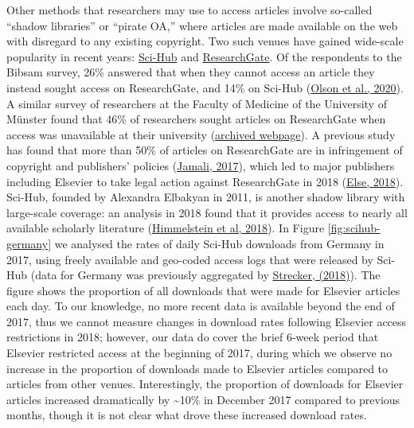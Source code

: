 \documentclass[
]{article}
\begin{document}
Other methods that researchers may use to access articles involve so-called ``shadow libraries'' or ``pirate OA,'' where articles are made available on the web with disregard to any existing copyright. Two such venues have gained wide-scale popularity in recent years: \href{https://sci-hub.se/}{Sci-Hub} and \href{https://www.researchgate.net/}{ResearchGate}. Of the respondents to the Bibsam survey, 26\% answered that when they cannot access an article they instead sought access on ResearchGate, and 14\% on Sci-Hub (\href{http://doi.org/10.1629/uksg.507}{Olson et al., 2020}). A similar survey of researchers at the Faculty of Medicine of the University of Münster found that 46\% of researchers sought articles on ResearchGate when access was unavailable at their university (\href{https://web.archive.org/web/20210429130228/https://www.uni-muenster.de/ZBMed/aktuelles/27987}{archived webpage}). A previous study has found that more than 50\% of articles on ResearchGate are in infringement of copyright and publishers' policies (\href{https://doi.org/10.1007/s11192-017-2291-4}{Jamali, 2017}), which led to major publishers including Elsevier to take legal action against ResearchGate in 2018 (\href{https://doi.org/10.1038/d41586-018-06945-6}{Else, 2018}). Sci-Hub, founded by Alexandra Elbakyan in 2011, is another shadow library with large-scale coverage: an analysis in 2018 found that it provides access to nearly all available scholarly literature (\href{https://doi.org/10.7554/eLife.32822}{Himmelstein et al, 2018}). In Figure \ref{fig:scihub-germany} we analysed the rates of daily Sci-Hub downloads from Germany in 2017, using freely available and geo-coded access logs that were released by Sci-Hub (data for Germany was previously aggregated by \href{http://doi.org/10.5281/zenodo.1286284}{Strecker, (2018)}). The figure shows the proportion of all downloads that were made for Elsevier articles each day. To our knowledge, no more recent data is available beyond the end of 2017, thus we cannot measure changes in download rates following Elsevier access restrictions in 2018; however, our data do cover the brief 6-week period that Elsevier restricted access at the beginning of 2017, during which we observe no increase in the proportion of downloads made to Elsevier articles compared to articles from other venues. Interestingly, the proportion of downloads for Elsevier articles increased dramatically by \textasciitilde10\% in December 2017 compared to previous months, though it is not clear what drove these increased download rates.
\end{document}
